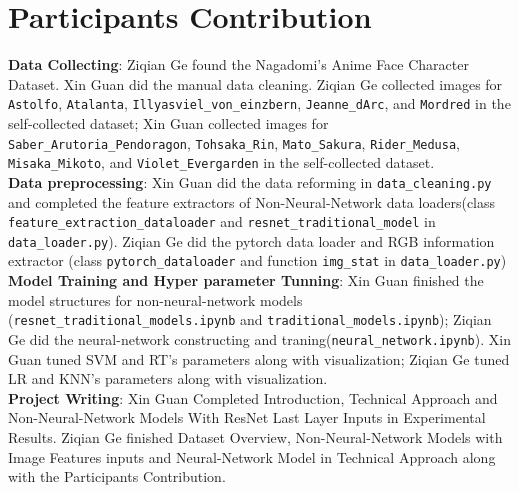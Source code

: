 \documentclass[11.5pt]{article}
\begin{document}
    \section{Participants Contribution}
    \textbf{Data Collecting}: Ziqian Ge found the Nagadomi's Anime Face Character Dataset. Xin Guan did the manual data cleaning. Ziqian Ge collected images for \texttt{Astolfo}, \texttt{Atalanta}, \texttt{Illyasviel\_von\_einzbern}, \texttt{Jeanne\_dArc}, and \texttt{Mordred} in the self-collected dataset; Xin Guan collected images for \texttt{Saber\_Arutoria\_Pendoragon}, \texttt{Tohsaka\_Rin}, \texttt{Mato\_Sakura}, \texttt{Rider\_Medusa}, \texttt{Misaka\_Mikoto}, and \texttt{Violet\_Evergarden} in the self-collected dataset.\\
    \textbf{Data preprocessing}: Xin Guan did the data reforming in \texttt{data\_cleaning.py} and completed the feature extractors of Non-Neural-Network data loaders(class \texttt{feature\_extraction\_dataloader} and \texttt{resnet\_traditional\_model} in \texttt{data\_loader.py}). Ziqian Ge did the pytorch data loader and RGB information extractor (class \texttt{pytorch\_dataloader} and function \texttt{img\_stat} in \texttt{data\_loader.py}) \\
    \textbf{Model Training and Hyper parameter Tunning}: Xin Guan finished the model structures for non-neural-network models (\texttt{resnet\_traditional\_models.ipynb} and \texttt{traditional\_models.ipynb}); Ziqian Ge did the neural-network constructing and traning(\texttt{neural\_network.ipynb}). Xin Guan tuned SVM and RT's parameters along with visualization; Ziqian Ge tuned LR and KNN's parameters along with visualization. \\
    \textbf{Project Writing}: Xin Guan Completed Introduction, Technical Approach and Non-Neural-Network Models With ResNet Last Layer Inputs in Experimental Results. Ziqian Ge finished Dataset Overview, Non-Neural-Network Models with Image Features inputs and Neural-Network Model in Technical Approach along with the Participants Contribution.
    \vspace{10mm}

\end{document}
